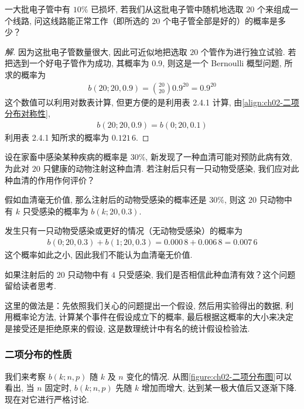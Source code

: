 \documentclass[../../main.tex]{subfiles}
\begin{document}
\begin{example}[电子管线路可靠性]\label{example:ch02-电子管线路可靠性}
一大批电子管中有 $10\%$ 已损坏, 若我们从这批电子管中随机地选取 $20$ 个来组成一个线路, 问这线路能正常工作（即所选的 $20$ 个电子管全部是好的）的概率是多少？

\begin{proof}[解]
因为这批电子管数量很大, 因此可近似地把选取 $20$ 个管作为进行独立试验. 若把选到一个好电子管作为成功, 其概率为 $0.9$, 则这是一个 Bernoulli 概型问题, 所求的概率为
\begin{align*}
b(20;20,0.9)=\binom{20}{20}0.9^{20}=0.9^{20}
\end{align*}
这个数值可以利用对数表计算, 但更方便的是利用表 2.4.1 计算, 由\eqref{align:ch02-二项分布对称性},
\begin{align*}
b(20;20,0.9)=b(0;20,0.1)
\end{align*}
利用表 2.4.1 知所求的概率为 $0.121\,6$.
\end{proof}
\end{example}

\begin{example}[血清的试验]\label{example:ch02-血清试验}
设在家畜中感染某种疾病的概率是 $30\%$, 新发现了一种血清可能对预防此病有效, 为此对 $20$ 只健康的动物注射这种血清. 若注射后只有一只动物受感染, 我们应对此种血清的作用作何评价？

假如血清毫无价值, 那么注射后的动物受感染的概率还是 $30\%$, 则这 $20$ 只动物中有 $k$ 只受感染的概率为 $b(k;20,0.3)$.

发生只有一只动物受感染或更好的情况（无动物受感染）的概率为
\begin{align*}
b(0;20,0.3)+b(1;20,0.3)=0.000\,8+0.006\,8=0.007\,6
\end{align*}
这个概率如此之小, 因此我们不能认为血清毫无价值.

如果注射后的 $20$ 只动物中有 $4$ 只受感染, 我们是否相信此种血清有效？这个问题留给读者思考.

这里的做法是：先依照我们关心的问题提出一个假设, 然后用实验得出的数据, 利用概率论方法, 计算某个事件在假设成立下的概率, 最后根据这概率的大小来决定是接受还是拒绝原来的假设, 这是数理统计中有名的统计假设检验法.
\end{example}

\subsubsection{二项分布的性质}

我们来考察 $b(k;n,p)$ 随 $k$ 及 $n$ 变化的情况. 从图\ref{figure:ch02-二项分布图}可以看出, 当 $n$ 固定时, $b(k;n,p)$ 先随 $k$ 增加而增大, 达到某一极大值后又逐渐下降. 现在对它进行严格讨论.
\end{document}
